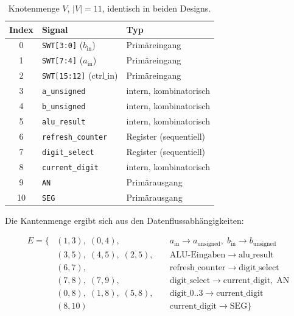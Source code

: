 ﻿\documentclass[12pt,a4paper]{report}
\begin{document}
\begin{table}[H]
	\centering
	\begin{tabular}{|c|l|l|}
		\hline
		\textbf{Index} & \textbf{Signal} & \textbf{Typ} \\
		\hline
		0 & \texttt{SWT[3:0]}  ($b_\mathrm{in}$)   & Primäreingang \\
		1 & \texttt{SWT[7:4]}  ($a_\mathrm{in}$)   & Primäreingang \\
		2 & \texttt{SWT[15:12]} ($\mathrm{ctrl\_in}$) & Primäreingang \\
		3 & \texttt{a\_unsigned}                      & intern, kombinatorisch \\
		4 & \texttt{b\_unsigned}                      & intern, kombinatorisch \\
		5 & \texttt{alu\_result}                      & intern, kombinatorisch \\
		6 & \texttt{refresh\_counter}                 & Register (sequentiell) \\
		7 & \texttt{digit\_select}                    & Register (sequentiell) \\
		8 & \texttt{current\_digit}                   & intern, kombinatorisch \\
		9 & \texttt{AN}                               & Primärausgang \\
		10 & \texttt{SEG}                             & Primärausgang \\
		\hline
	\end{tabular}
	\caption{Knotenmenge $V$, $|V| = 11$, identisch in beiden Designs.}
	\label{tab:knoten_vv}
\end{table}

Die Kantenmenge ergibt sich aus den Datenflussabhängigkeiten:

\begin{align*}
	E = \{
	&(1, 3),\; (0, 4),\;                       && a_\mathrm{in} \to a_\mathrm{unsigned},\; b_\mathrm{in} \to b_\mathrm{unsigned}\\
	&(3, 5),\; (4, 5),\; (2, 5),\;             && \text{ALU-Eingaben} \to \mathrm{alu\_result}\\
	&(6, 7),\;                                 && \mathrm{refresh\_counter} \to \mathrm{digit\_select} \\
	&(7, 8),\; (7, 9),\;                       && \mathrm{digit\_select} \to \mathrm{current\_digit},\; \mathrm{AN}\\
	&(0, 8),\; (1, 8),\; (5, 8),\;             && \mathrm{digit\_0..3} \to \mathrm{current\_digit}\\
	&(8, 10)\;                                 && \mathrm{current\_digit} \to \mathrm{SEG}
	\}
\end{align*}
\end{document}
